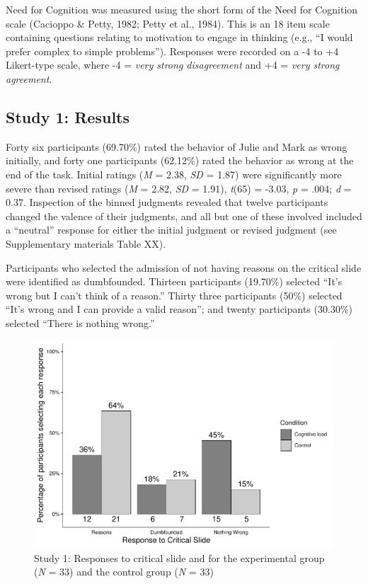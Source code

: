 \documentclass[
  american,
  man,floatsintext]{apa7}
\begin{document}
Need for Cognition was measured using the short form of the Need for Cognition scale (Cacioppo \& Petty, 1982; Petty et al., 1984). This is an 18 item scale containing questions relating to motivation to engage in thinking (e.g., ``I would prefer complex to simple problems''). Responses were recorded on a -4 to +4 Likert-type scale, where -4 = \emph{very strong disagreement} and +4 = \emph{very strong agreement}.

\hypertarget{study-1-results}{%
\subsection{Study 1: Results}\label{study-1-results}}

Forty six participants (69.70\%) rated the behavior of Julie and Mark as wrong initially, and forty one participants (62.12\%) rated the behavior as wrong at the end of the task. Initial ratings (\emph{M} = 2.38, \emph{SD} = 1.87) were significantly more severe than revised ratings (\emph{M} = 2.82, \emph{SD} = 1.91), \emph{t}(65) = -3.03, \emph{p} = .004; \emph{d} = 0.37. Inspection of the binned judgments revealed that twelve participants changed the valence of their judgments, and all but one of these involved included a ``neutral'' response for either the initial judgment or revised judgment (see Supplementary materials Table XX).

Participants who selected the admission of not having reasons on the critical slide were identified as dumbfounded. Thirteen participants (19.70\%) selected ``It's wrong but I can't think of a reason.'' Thirty three participants (50\%) selected ``It's wrong and I can provide a valid reason''; and twenty participants (30.30\%) selected ``There is nothing wrong.''

\begin{figure}
\centering
\includegraphics{Study_1_files/figure-latex/S1S1fig2criticalcondition-1.pdf}
\caption{\label{fig:S1S1fig2criticalcondition}Study 1: Responses to critical slide and for the experimental group (\emph{N} = 33) and the control group (\emph{N} = 33)}
\end{figure}
\end{document}
